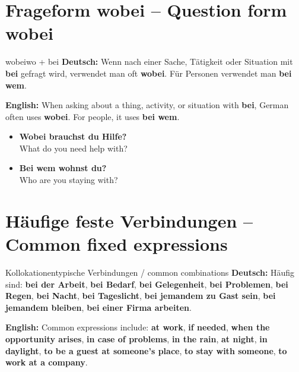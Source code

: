 \documentclass[a4paper,11pt]{article}
\newcommand{\GermanText}[1]{\textbf{Deutsch: }#1\par}
\newcommand{\EnglishText}[1]{{\small\color{SoftGray}\textbf{English: }#1\par}}
\newcommand{\ExampleItem}[2]{\item \textbf{#1}\\{\small\color{SoftGray}#2}}
\begin{document}
   \section{Frageform wobei -- Question form wobei}
                                             \begin{grammarentry}{wobei}{wo + bei}
                                                \GermanText{Wenn nach einer Sache, Tätigkeit oder Situation mit \textbf{bei} gefragt wird, verwendet man oft \textbf{wobei}. Für Personen verwendet man \textbf{bei wem}.}
                                                \EnglishText{When asking about a thing, activity, or situation with \textbf{bei}, German often uses \textbf{wobei}. For people, it uses \textbf{bei wem}.}
                                             \end{grammarentry}
                                             \begin{exbox}\begin{itemize}
                                                \ExampleItem{Wobei brauchst du Hilfe?}{What do you need help with?}
                                                \ExampleItem{Bei wem wohnst du?}{Who are you staying with?}
                                                \end{itemize}\end{exbox}

   \section{Häufige feste Verbindungen -- Common fixed expressions}
                                                \begin{grammarentry}{Kollokationen}{typische Verbindungen / common combinations}
                                                   \GermanText{Häufig sind: \textbf{bei der Arbeit}, \textbf{bei Bedarf}, \textbf{bei Gelegenheit}, \textbf{bei Problemen}, \textbf{bei Regen}, \textbf{bei Nacht}, \textbf{bei Tageslicht}, \textbf{bei jemandem zu Gast sein}, \textbf{bei jemandem bleiben}, \textbf{bei einer Firma arbeiten}.}
                                                   \EnglishText{Common expressions include: \textbf{at work}, \textbf{if needed}, \textbf{when the opportunity arises}, \textbf{in case of problems}, \textbf{in the rain}, \textbf{at night}, \textbf{in daylight}, \textbf{to be a guest at someone's place}, \textbf{to stay with someone}, \textbf{to work at a company}.}
                                                \end{grammarentry}
\end{document}
